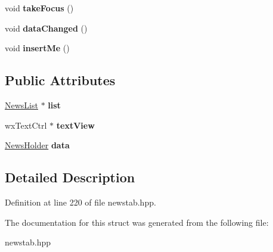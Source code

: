 \begin{DoxyCompactItemize}
\item 
\hypertarget{struct_news_tab_ab7f276b0d863e45af46df1b4caf56ad4}{void {\bfseries take\-Focus} ()}\label{struct_news_tab_ab7f276b0d863e45af46df1b4caf56ad4}

\item 
\hypertarget{struct_news_tab_ae338ae593a329a92f4bb360e47adb3e9}{void {\bfseries data\-Changed} ()}\label{struct_news_tab_ae338ae593a329a92f4bb360e47adb3e9}

\item 
\hypertarget{struct_news_tab_a92cd045fe93885b4052682eaa8a7ab3e}{void {\bfseries insert\-Me} ()}\label{struct_news_tab_a92cd045fe93885b4052682eaa8a7ab3e}

\end{DoxyCompactItemize}
\subsection*{Public Attributes}
\begin{DoxyCompactItemize}
\item 
\hypertarget{struct_news_tab_a3f0fc116ca5ce5e7cf3dfc9aa62501ca}{\hyperlink{class_news_list}{News\-List} $\ast$ {\bfseries list}}\label{struct_news_tab_a3f0fc116ca5ce5e7cf3dfc9aa62501ca}

\item 
\hypertarget{struct_news_tab_a4b1361cf9d8dbfaefc4570ee7883ffbf}{wx\-Text\-Ctrl $\ast$ {\bfseries text\-View}}\label{struct_news_tab_a4b1361cf9d8dbfaefc4570ee7883ffbf}

\item 
\hypertarget{struct_news_tab_a57330a8c7df10f9e15dce62d733822d5}{\hyperlink{struct_news_holder}{News\-Holder} {\bfseries data}}\label{struct_news_tab_a57330a8c7df10f9e15dce62d733822d5}

\end{DoxyCompactItemize}


\subsection{Detailed Description}


Definition at line 220 of file newstab.\-hpp.



The documentation for this struct was generated from the following file\-:\begin{DoxyCompactItemize}
\item 
newstab.\-hpp\end{DoxyCompactItemize}
